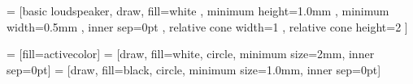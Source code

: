 
 = [basic loudspeaker, draw, fill=white
, minimum height=1.0mm 	    %
, minimum width=0.5mm		    %
, inner sep=0pt
, relative cone width=1	%
, relative cone height=2	    %
]

 = [fill=activecolor]
 = [draw, fill=white, circle, minimum size=2mm, inner sep=0pt]
 = [draw, fill=black, circle, minimum size=1.0mm, inner 
sep=0pt]


